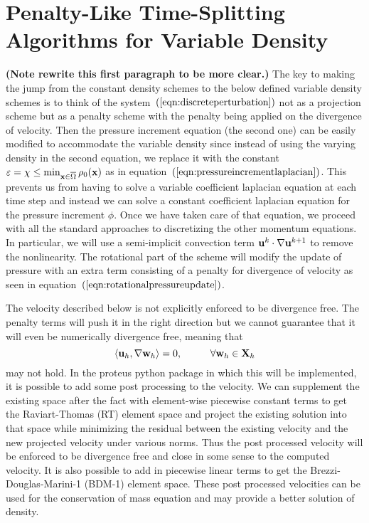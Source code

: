 \documentclass[letterpaper]{erdc}
\begin{document}
%
%
%
%
\chapter{Penalty-Like Time-Splitting Algorithms for Variable Density}
\textbf{(Note rewrite this first paragraph to be more clear.)} The key to making the jump from the constant density schemes to the below defined variable density schemes is to think of the system~$\left(\ref{eqn:discreteperturbation}\right)$ not as a projection scheme but as a penalty scheme with the penalty being applied on the divergence of velocity.  Then the pressure increment equation (the second one) can be easily modified to accommodate the variable density since instead of using the varying density in the second equation, we replace it with the constant $\varepsilon = \chi \leq \min_{\textbf{x}\in\overline{\Omega}}\rho_0(\textbf{x})$ as in equation~$\left(\ref{eqn:pressureincrementlaplacian}\right)$.  This prevents us from having to solve a variable coefficient laplacian equation at each time step and instead we can solve a constant coefficient laplacian equation for the pressure increment $\phi$.  Once we have taken care of that equation, we proceed with all the standard approaches to discretizing the other momentum equations.  In particular, we will use a semi-implicit convection term $\textbf{u}^{k}\cdot\nabla\textbf{u}^{k+1}$ to remove the nonlinearity.  The rotational part of the scheme will modify the update of pressure with an extra term consisting of a penalty for divergence of velocity as seen in equation~$\left(\ref{eqn:rotationalpressureupdate}\right)$.  

The velocity described below is not explicitly enforced to be divergence free.  The penalty terms will push it in the right direction but we cannot guarantee that it will even be numerically divergence free, meaning that 
\begin{equation}
  \left\langle \textbf{u}_h, \nabla\textbf{w}_h \right\rangle = 0, \hspace{1cm}\forall\textbf{w}_h\in\textbf{X}_h
\end{equation}
may not hold.  In the proteus python package in which this will be implemented, it is possible to add some post processing to the velocity.  We can supplement the existing space after the fact with element-wise piecewise constant terms to get the Raviart-Thomas (RT) element space and project the existing solution into that space while minimizing the residual between the existing velocity and the new projected velocity under various norms.    Thus the post processed velocity will be enforced to be divergence free and close in some sense to the computed velocity.  It is also possible to add in piecewise linear terms to get the Brezzi-Douglas-Marini-1 (BDM-1) element space.  These post processed velocities can be used for the conservation of mass equation and may provide a better solution of density.
\end{document}
